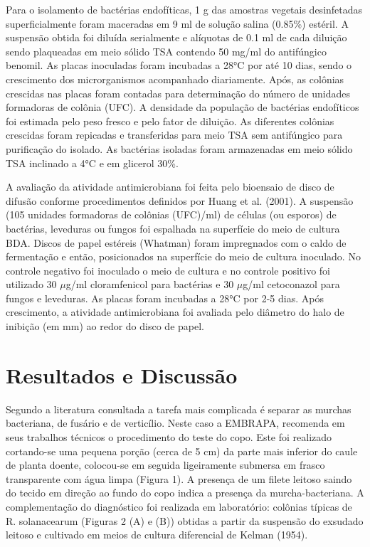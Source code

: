 \documentclass[article,12pt,onesidea,4paper,english,brazil]{abntex2}
\begin{document}
Para o isolamento de bactérias endofíticas, 1 g das amostras vegetais desinfetadas superficialmente foram maceradas em 9 ml de solução salina (0.85\%) estéril. A suspensão obtida foi diluída serialmente e alíquotas de 0.1 ml de cada diluição sendo plaqueadas em meio sólido TSA contendo 50 mg/ml do antifúngico benomil. As placas inoculadas foram incubadas a 28°C por até 10 dias, sendo o crescimento dos microrganismos acompanhado diariamente. Após, as colônias crescidas nas placas foram contadas para determinação do número de unidades formadoras de colônia (UFC). A densidade da população de bactérias endofíticos foi estimada pelo peso fresco e pelo fator de diluição. As diferentes colônias crescidas foram repicadas e transferidas para meio TSA sem antifúngico para purificação do isolado. As bactérias isoladas foram armazenadas em meio sólido TSA inclinado a 4°C e em glicerol 30\%.

A avaliação da atividade antimicrobiana foi feita pelo bioensaio de disco de difusão conforme procedimentos definidos por Huang et al. (2001). A suspensão (105 unidades formadoras de colônias (UFC)/ml) de células (ou esporos) de bactérias, leveduras ou fungos foi espalhada na superfície do meio de cultura BDA. Discos de papel estéreis (Whatman) foram impregnados com o caldo de fermentação e então, posicionados na superfície do meio de cultura inoculado. No controle negativo foi inoculado o meio de cultura e no controle positivo foi utilizado
30 $\mu$g/ml cloramfenicol para bactérias e 30 $\mu$g/ml cetoconazol para fungos e leveduras. As placas foram incubadas a 28°C por 2-5 dias. Após crescimento, a atividade antimicrobiana foi avaliada pelo diâmetro do halo de inibição (em mm) ao redor do disco de papel.
	
	\section*{Resultados e Discussão}

Segundo a literatura consultada a tarefa mais complicada é separar as murchas bacteriana, de fusário e de verticílio. Neste caso a EMBRAPA, recomenda em seus trabalhos técnicos o procedimento do teste do copo. Este foi realizado cortando-se uma pequena porção (cerca de 5 cm) da parte mais inferior do caule de planta doente, colocou-se em seguida ligeiramente submersa em frasco transparente com água limpa (Figura 1). A presença de um filete leitoso saindo do tecido em direção ao fundo do copo indica	a	presença		da	murcha-bacteriana.		A complementação	do	diagnóstico	foi	realizada	em laboratório: colônias típicas de R. solanacearum (Figuras 2 (A) e (B)) obtidas a partir da suspensão do exsudado leitoso e cultivado em meios de cultura diferencial de Kelman (1954).
\end{document}
